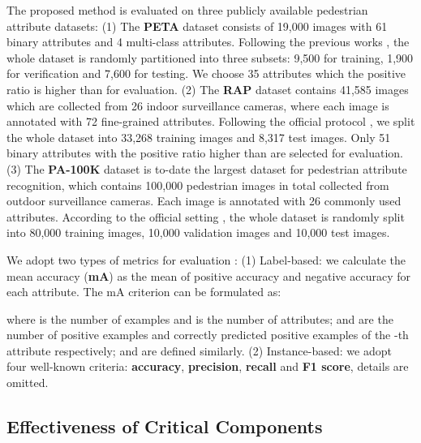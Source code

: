 \documentclass[10pt,twocolumn,letterpaper]{article}
\begin{document}
The proposed method is evaluated on three publicly available pedestrian attribute datasets:
(1) The \textbf{PETA} dataset \cite{deng2014pedestrian} consists of 19,000 images with 61 binary attributes and 4 multi-class attributes.
Following the previous works \cite{deng2014pedestrian,deepview}, the whole dataset is randomly partitioned into three subsets: 9,500 for training, 1,900 for verification and 7,600 for testing.
We choose 35 attributes which the positive ratio is higher than  for evaluation.
(2) The \textbf{RAP} dataset \cite{rap} contains 41,585 images which are
collected from 26 indoor surveillance cameras, where each image is annotated with 72 fine-grained attributes.
Following the official protocol \cite{rap}, we
split the whole dataset into 33,268 training images and 8,317 test images.
Only 51 binary attributes with the positive ratio higher than  are selected for evaluation.
(3) The \textbf{PA-100K} dataset \cite{hpnet} is to-date the largest dataset for pedestrian attribute
recognition, which contains 100,000 pedestrian images in total collected from outdoor surveillance
cameras. Each image is annotated with 26 commonly used attributes. According to the official
setting \cite{hpnet}, the whole dataset is randomly split into 80,000 training images, 10,000 validation
images and 10,000 test images.

We adopt two types of metrics for evaluation \cite{rap}:
(1) Label-based: we calculate the mean accuracy (\textbf{mA}) as the mean of positive accuracy and negative
accuracy for each attribute. The mA criterion can be formulated as:

where  is the number of examples and  is the number of attributes;  and  are the number of positive examples and correctly predicted positive examples of the -th attribute respectively;  and  are defined similarly.
(2) Instance-based: we adopt four well-known criteria: \textbf{accuracy}, \textbf{precision}, \textbf{recall} and \textbf{F1 score}, details are omitted.


\subsection{Effectiveness of Critical Components}
\end{document}
